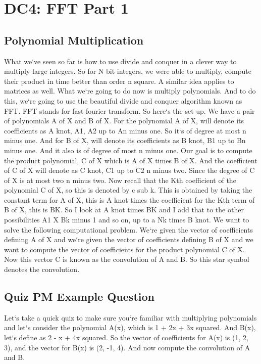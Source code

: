 \section{DC4: FFT   Part 1}

\subsection{Polynomial Multiplication}
What we`ve seen so far is how to use divide and conquer in a clever way to multiply large integers.
So for N bit integers, we were able to multiply, compute their product in time better than order n square.
A similar idea applies to matrices as well.
What we`re going to do now is multiply polynomials.
And to do this, we`re going to use the beautiful divide and conquer algorithm known as FFT\@.
FFT stands for fast fourier transform.
So here`s the set up.
We have a pair of polynomials A of X and B of X\@.
For the polynomial A of X, will denote its coefficients as A knot, A1, A2 up to An minus one.
So it`s of degree at most n minus one.
And for B of X, will denote its coefficients as B knot, B1 up to Bn minus one.
And it also is of degree of most n minus one.
Our goal is to compute the product polynomial, C of X which is A of X times B of X\@.
And the coefficient of C of X will denote as C knot, C1 up to C2 n minus two.
Since the degree of C of X is at most two n minus two.
Now recall that the Kth coefficient of the polynomial C of X, so this is denoted by c sub k.
This is obtained by taking the constant term for A of X, this is A knot times the coefficient for the Kth term of B of X, this is BK\@.
So I look at A knot times BK and I add that to the other possibilities A1 X Bk minus 1 and so on, up to a Nk times B knot.
We want to solve the following computational problem.
We`re given the vector of coefficients defining A of X and we`re given the vector of coefficients defining B of X and we want to compute the vector of coefficients for the product polynomial C of X\@.
Now this vector C is known as the convolution of A and B\@.
So this star symbol denotes the convolution.

\subsection{Quiz  PM  Example Question}
Let`s take a quick quiz to make sure you`re familiar with multiplying polynomials and let`s consider the polynomial A(x), which is 1 + 2x + 3x squared.
And B(x), let`s define as 2 - x + 4x squared.
So the vector of coefficients for A(x) is (1, 2, 3), and the vector for B(x) is (2, -1, 4).
And now compute the convolution of A and B\@.

